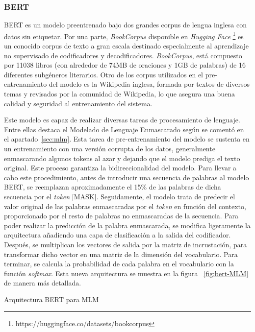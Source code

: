 \subsubsection{BERT}


BERT es un modelo preentrenado bajo dos grandes corpus de lengua inglesa con datos sin etiquetar. Por una parte, \textit{BookCorpus} \citep{Zhu_2015_ICCV} disponible en \textit{Hugging Face} \footnote{https://huggingface.co/datasets/bookcorpus} es un conocido corpus de texto a gran escala destinado especialmente al aprendizaje no supervisado  de codificadores y decodificadores. \textit{BookCorpus}, está compuesto por 11038 libros (con alrededor de 74MB de oraciones y 1GB de palabras) de 16 diferentes subgéneros literarios. Otro de los corpus utilizados en el pre-entrenamiento del modelo es la Wikipedia inglesa, formada por textos de diversos temas y revisados por la comunidad de Wikipedia, lo que asegura una buena calidad y seguridad al entrenamiento del sistema.


Este modelo es capaz de realizar diversas tareas de procesamiento de lenguaje. Entre ellas destaca el Modelado de Lenguaje Enmascarado según se comentó en el apartado~\ref{sec:mlm}. Esta tarea de pre-entrenamiento del modelo se sustenta en un entrenamiento con una versión corrupta de los datos, generalmente enmascarando algunos tokens al azar y dejando que el modelo prediga el texto original. Este proceso garantiza la bidireccionalidad del modelo. Para llevar a cabo este procedimiento, antes de introducir una secuencia de palabras al modelo BERT, se reemplazan aproximadamente el 15\% de las palabras de dicha secuencia por el \textit{token} [MASK]. Seguidamente, el modelo trata de predecir el valor original de las palabras enmascaradas por el \textit{token} en función del contexto, proporcionado por el resto de palabras no enmascaradas de la secuencia. Para poder realizar la predicción de la palabra enmascarada, se modifica ligeramente la arquitectura añadiendo una capa de clasificación a la salida del codificador. Después, se multiplican los vectores de salida por la matriz de incrustación, para transformar dicho vector en una matriz de la dimensión del vocabulario. Para terminar, se calcula la probabilidad de cada palabra en el vocabulario con la función \textit{softmax}. Esta nueva arquitectura se muestra en la figura ~\ref{fig:bert-MLM} de manera más detallada.

%
{Arquitectura BERT para MLM}


